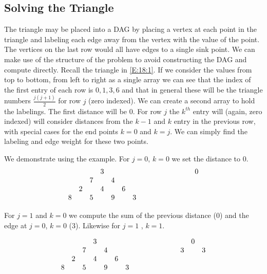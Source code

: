 \documentclass[oneside,12pt]{book}   	%
\newcounter{ex}
\newcounter{pr}
\theoremstyle{definition}
\begin{document}
\begin{spacing}{1.618}
		\section{Solving the Triangle}
		
			The triangle may be placed into a DAG by placing a vertex at each point in the triangle and labeling each edge away from the vertex with the value of the point. The vertices on the last row would all have edges to a single sink point. We can make use of the structure of the problem to avoid constructing the DAG and compute directly. Recall the triangle in \ref{E:18:1}. If we consider the values from top to bottom, from left to right as a single array we can see that the index of the first entry of each row is $0, 1, 3, 6$ and that in general these will be the triangle numbers $\frac{j(j+1)}{2}$ for row $j$ (zero indexed). We can create a second array to hold the labelings. The first distance will be $0$. For row $j$ the $k^{th}$ entry will (again, zero indexed) will consider distances from the $k-1$ and $k$ entry in the previous row, with special cases for the end points $k=0$ and $k=j$. We can simply find the labeling and edge weight for these two points. 

			We demonstrate using the example. For $j=0$, $k=0$ we set the distance to $0$. 
			\begin{alignat}{4}
				\begin{array}{ccccccc}
					&&&{3}&&& \\
					&&{7}&& 4&& \\
					&2&&{4}&& 6& \\
					8 && 5 && {9} && 3
				\end{array} &\hspace{1 cm}&\begin{array}{ccccccc}
					&&& 0 \\
					\ \\
					\ \\
					\
				\end{array}
			\end{alignat}
			
			For $j=1$ and $k=0$ we compute the sum of the previous distance ($0$) and the edge at $j=0$, $k=0$ ($3$). Likewise for $j=1$ , $k=1$. 

			\begin{alignat}{4}
				\begin{array}{ccccccc}
					&&&{3}&&& \\
					&&{7}&& 4&& \\
					&2&&{4}&& 6& \\
					8 && 5 && {9} && 3
				\end{array} &\hspace{1 cm}&\begin{array}{ccccccc}
					&&& 0 \\
					&& 3 && 3\\
					\ \\
					\
				\end{array}
			\end{alignat}
			

\end{spacing}
\end{document}
